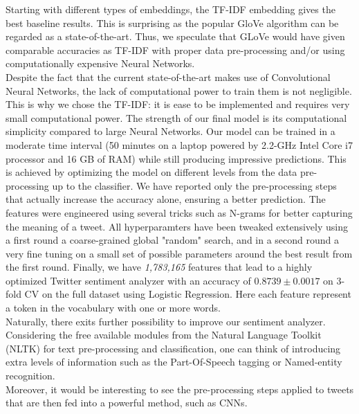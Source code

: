 Starting with different types of embeddings, the TF-IDF embedding gives the best baseline results. 
This is surprising as the popular GloVe algorithm can be regarded as a state-of-the-art. 
Thus, we speculate that GLoVe would have given comparable accuracies as TF-IDF with proper data pre-processing and/or using computationally expensive Neural Networks.\\ %
Despite the fact that the current state-of-the-art\cite{deriu2016swisscheese} makes use of Convolutional Neural Networks, the lack of computational power to train them is not negligible.
This is why we chose the TF-IDF: it is ease to be implemented and requires very small computational power. 
The strength of our final model is its computational simplicity compared to large Neural Networks. 
Our model can be trained in a moderate time interval (50 minutes on a laptop powered by 2.2-GHz Intel Core i7 processor and 16 GB of RAM) while still producing impressive predictions. 
This is achieved by optimizing the model on different levels from the data pre-processing up to the classifier. 
We have reported only the pre-processing steps that actually increase the accuracy alone, ensuring a better prediction. 
The features were engineered using several tricks such as N-grams for better capturing the meaning of a tweet. 
All hyperparamters have been tweaked extensively using a first round a coarse-grained global "random" search, and in a second round a very fine tuning on a small set of possible parameters around the best result from the first round. Finally, we have \textit{1,783,165} features that lead to a highly optimized Twitter sentiment analyzer with an accuracy of $0.8739 \pm 0.0017$ on 3-fold CV on the full dataset using Logistic Regression. Here each feature represent a token in the vocabulary with one or more words.\\
Naturally, there exits further possibility to improve our sentiment analyzer.
Considering the free available modules from the Natural Language Toolkit (NLTK)\cite{Loper:2002:NNL:1118108.1118117} for text pre-processing and classification, one can think of introducing extra levels of information such as the Part-Of-Speech tagging or Named-entity recognition.\\
Moreover, it would be interesting to see the pre-processing steps applied to tweets that are then fed into a powerful method, such as CNNs.